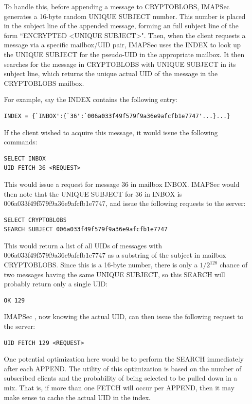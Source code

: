 \documentclass[pageno]{jpaper}
\newcommand{\project}{IMAPSec }
\begin{document}
To handle this, before appending a message to CRYPTOBLOBS, \project generates a 16-byte random UNIQUE SUBJECT number. This number is placed in the subject line of the appended message, forming an full subject line of the form ``ENCRYPTED <UNIQUE SUBJECT>". Then, when the client requests a message via a specific mailbox/UID pair, \project uses the INDEX to look up the UNIQUE SUBJECT for the pseudo-UID in the appropriate mailbox. It then searches for the message in CRYPTOBLOBS with UNIQUE SUBJECT in its subject line, which returns the unique actual UID of the message in the CRYPTOBLOBS mailbox.

For example, say the INDEX contains the following entry:

\begin{lstlisting}
INDEX = {`INBOX':{`36':`006a033f49f579f9a36e9afcfb1e7747'...}...}
\end{lstlisting}

If the client wished to acquire this message, it would issue the following commands:

\begin{lstlisting}
SELECT INBOX
UID FETCH 36 <REQUEST>
\end{lstlisting}

This would issue a request for message 36 in mailbox INBOX. \project would then note that
the UNIQUE SUBJECT for 36 in INBOX is 006a033f49f579f9a36e9afcfb1e7747, and issue the following requests to the server:

\begin{lstlisting}
SELECT CRYPTOBLOBS
SEARCH SUBJECT 006a033f49f579f9a36e9afcfb1e7747
\end{lstlisting}

This would return a list of all UIDs of messages with 006a033f49f579f9a36e9afcfb1e7747 as a substring of the subject in mailbox CRYPTOBLOBS. Since this is a 16-byte number, there is only a $1/2^{128}$ chance of two messages having the same UNIQUE SUBJECT, so this SEARCH will probably return only a single UID:

\begin{lstlisting}
OK 129
\end{lstlisting}


\project, now knowing the actual UID, can then issue the following request to the server:

\begin{lstlisting}
UID FETCH 129 <REQUEST>
\end{lstlisting}

One potential optimization here would be to perform the SEARCH immediately after each APPEND. The utility of this optimization is based on the number of subscribed clients and the probability of being selected to be pulled down in a mix. That is, if more than one FETCH will occur per APPEND, then it may make sense to cache the actual UID in the index.
\end{document}
